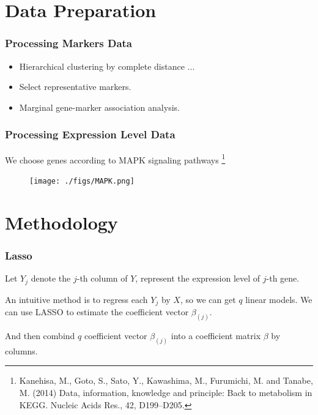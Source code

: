 \section{Data Preparation}
\begin{frame}
    \sectionpage
\end{frame}

\begin{frame}
    \frametitle{Processing Markers Data}

    \begin{itemize}
        \item Hierarchical clustering by complete distance ...
        \item Select representative markers.
        \item Marginal gene-marker association analysis.
    \end{itemize}
\end{frame}

\begin{frame}
    \frametitle{Processing Expression Level Data}

    We choose genes according to MAPK signaling pathways \footnote[2]{Kanehisa, M., Goto, S., Sato, Y., Kawashima, M., Furumichi, M. and Tanabe, M. (2014) Data, information, knowledge and principle: Back to metabolism in KEGG. Nucleic Acids Res., 42, D199–D205.}

    \begin{figure}[h]
        \centering
        \texttt{[image: ./figs/MAPK.png]}
    \end{figure}
\end{frame}



\section{Methodology}
\begin{frame}
    \sectionpage
\end{frame}

\begin{frame}
    \frametitle{Lasso}

    Let $Y_j$ denote the $j$-th column of $Y$, represent the expression level of $j$-th gene. 

    An intuitive method is to regress each $Y_j$ by $X$, so we can get $q$ linear models. 
    We can use LASSO to estimate the coefficient vector $\beta_{(j)}$. 
    
    And then combind $q$ coefficient vector $\beta_{(j)}$ into a coefficient matrix $\mathbb{\beta}$ by columns. 
\end{frame}


